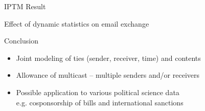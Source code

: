 \documentclass[10pt]{beamer}
\def\bni{\begin{itemize}} \def\ei{\end{itemize}}
\theoremstyle{definition}
\theoremstyle{remark}
\begin{document}
\begin{frame}{IPTM Result}
{\begin{minipage}{0.55\textwidth}
\begin{table}[ht]
			\caption{Effect of dynamic statistics on email exchange}
		\end{table}
		\end{minipage}
	}
\end{frame}

\begin{frame}{Conclusion}
 \bni
 \item Joint modeling of ties (sender, receiver, time) and contents
 	\vspace{0.4cm}
 \item Allowance of multicast -- multiple senders and/or receivers
 	\vspace{0.4cm}
 \item Possible application to various political science data\\ e.g. cosponsorship of bills and international sanctions
 \ei
\end{frame}
\end{document}
